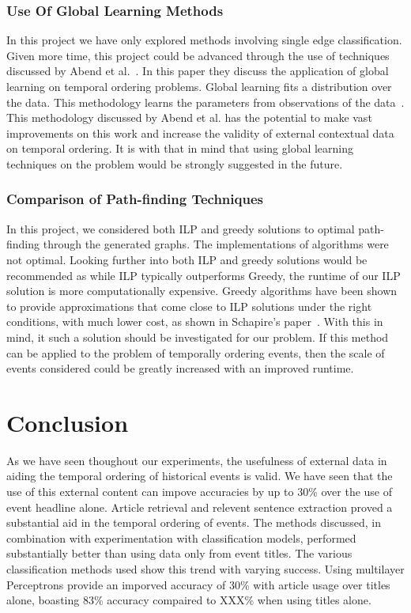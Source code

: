 \documentclass[bsc,frontabs,twoside,singlespacing,parskip,deptreport]{infthesis}     %
\begin{document}
\subsection{Use Of Global Learning Methods}
In this project we have only explored methods involving single edge classification. Given more time,
this project could be advanced through the use of techniques discussed by Abend et al.~\cite{abend2015lexical}.
In this paper they discuss the application of global learning on temporal ordering problems. Global learning
fits a distribution over the data. This methodology learns the parameters from observations of the data~\cite{Huang2008}.
This methodology discussed by Abend et al. has the potential to make vast improvements on this work and increase the validity
of external contextual data on temporal ordering. It is with that in mind that using global learning techniques on the problem
would be strongly suggested in the future.

\subsection{Comparison of Path-finding Techniques}
In this project, we considered both ILP and greedy solutions to optimal path-finding through the generated graphs.
The implementations of algorithms were not optimal. Looking further into both ILP and greedy solutions would
be recommended as while ILP typically outperforms Greedy, the runtime of our ILP solution is more computationally
expensive. Greedy algorithms have been shown to provide approximations that come close to ILP solutions under the right
conditions, with much lower cost, as shown in Schapire's paper~\cite{schapire1998learning}. With this in mind,
it such a solution should be investigated for our problem. If this method can
be applied to the problem of temporally ordering events, then the scale of events considered could be greatly increased with
an improved runtime.



\chapter{Conclusion}
As we have seen thoughout our experiments, the usefulness of external data in aiding the temporal ordering
of historical events is valid. We have seen that the use of this external content can impove accuracies by up to
30\% over the use of event headline alone.
Article retrieval and relevent sentence extraction proved a substantial aid in the temporal ordering of events.
The methods discussed, in combination with experimentation with classification models, performed substantially better
than using data only from event titles.
The various classification methods used show this trend with varying success. Using multilayer Perceptrons provide an
imporved accuracy of 30\% with article usage over titles alone, boasting 83\% accuracy compaired to XXX\% when using titles
alone.
\end{document}
